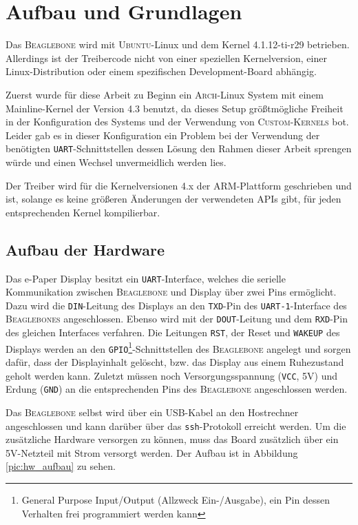 \chapter{Aufbau und Grundlagen} %
Das \textsc{Beaglebone} wird mit \textsc{Ubuntu}-Linux und dem Kernel 4.1.12-ti-r29 betrieben. Allerdings ist der Treibercode nicht von einer speziellen Kernelversion, einer Linux-Distribution oder einem spezifischen Development-Board abhängig. 

Zuerst wurde für diese Arbeit zu Beginn ein \textsc{Arch}-Linux System mit einem Mainline-Kernel der Version 4.3 benutzt, da dieses Setup größtmögliche Freiheit in der Konfiguration des Systems und der Verwendung von \textsc{Custom-Kernels} bot. Leider gab es in dieser Konfiguration ein Problem bei der Verwendung der benötigten \texttt{UART}-Schnittstellen dessen Lösung den Rahmen dieser Arbeit sprengen würde und einen Wechsel unvermeidlich werden lies.

Der Treiber wird für die Kernelversionen 4.x der \textsc{ARM}-Plattform geschrieben und ist, solange es keine größeren Änderungen der verwendeten APIs gibt, für jeden entsprechenden Kernel kompilierbar.

\section{Aufbau der Hardware}
Das e-Paper Display besitzt ein \texttt{UART}-Interface, welches die serielle Kommunikation zwischen \textsc{Beaglebone} und Display über zwei Pins ermöglicht. Dazu wird die \texttt{DIN}-Leitung des Displays an den \texttt{TXD}-Pin des \texttt{UART-1}-Interface des \textsc{Beaglebones} angeschlossen. Ebenso wird mit der \texttt{DOUT}-Leitung und dem \texttt{RXD}-Pin des gleichen Interfaces verfahren. Die Leitungen \texttt{RST}, der Reset und \texttt{WAKEUP} des Displays werden an den \texttt{GPIO}\footnote{General Purpose Input/Output (Allzweck Ein-/Ausgabe), ein Pin dessen Verhalten frei programmiert werden kann}-Schnittstellen des \textsc{Beaglebone} angelegt und sorgen dafür, dass der Displayinhalt gelöscht, bzw. das Display aus einem Ruhezustand geholt werden kann. Zuletzt müssen noch Versorgungsspannung (\texttt{VCC}, 5V) und Erdung (\texttt{GND}) an die entsprechenden Pins des \textsc{Beaglebone} angeschlossen werden.  

Das \textsc{Beaglebone} selbst wird über ein USB-Kabel an den Hostrechner angeschlossen und kann darüber über das \texttt{ssh}-Protokoll erreicht werden. Um die zusätzliche Hardware versorgen zu können, muss das Board zusätzlich über ein 5V-Netzteil mit Strom versorgt werden. Der Aufbau ist in Abbildung \ref{pic:hw_aufbau} zu sehen.

